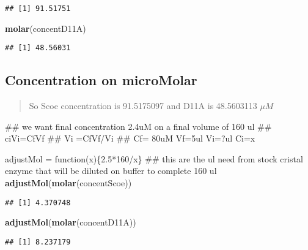 \documentclass[]{article}
\newenvironment{Shaded}{\begin{snugshade}}{\end{snugshade}}
\newcommand{\KeywordTok}[1]{\textcolor[rgb]{0.13,0.29,0.53}{\textbf{{#1}}}}
\newcommand{\DecValTok}[1]{\textcolor[rgb]{0.00,0.00,0.81}{{#1}}}
\newcommand{\FloatTok}[1]{\textcolor[rgb]{0.00,0.00,0.81}{{#1}}}
\newcommand{\StringTok}[1]{\textcolor[rgb]{0.31,0.60,0.02}{{#1}}}
\newcommand{\NormalTok}[1]{{#1}}
\begin{document}
\begin{verbatim}
## [1] 91.51751
\end{verbatim}

\begin{Shaded}
\begin{Highlighting}[]
\KeywordTok{molar}\NormalTok{(concentD11A)}
\end{Highlighting}
\end{Shaded}

\begin{verbatim}
## [1] 48.56031
\end{verbatim}

\subsection{Concentration on
microMolar}\label{concentration-on-micromolar}

\begin{quote}
So Scoe concentration is 91.5175097 and D11A is 48.5603113 \(\mu M\)
\end{quote}

\begin{Shaded}
\begin{Highlighting}[]
\NormalTok{## we want final concentration 2.4uM on a final volume of 160 ul}
\NormalTok{## ciVi=CfVf}
\NormalTok{## Vi =CfVf/Vi}
\NormalTok{## Cf= 80uM Vf=5ul Vi=?ul Ci=x}

\NormalTok{adjustMol =}\StringTok{ }\NormalTok{function(x)\{}\FloatTok{2.5}\NormalTok{*}\DecValTok{160}\NormalTok{/x\} }
\NormalTok{## this are the ul need from stock cristal enzyme that will be diluted on buffer to complete 160 ul }
\KeywordTok{adjustMol}\NormalTok{(}\KeywordTok{molar}\NormalTok{(concentScoe))}
\end{Highlighting}
\end{Shaded}

\begin{verbatim}
## [1] 4.370748
\end{verbatim}

\begin{Shaded}
\begin{Highlighting}[]
\KeywordTok{adjustMol}\NormalTok{(}\KeywordTok{molar}\NormalTok{(concentD11A))}
\end{Highlighting}
\end{Shaded}

\begin{verbatim}
## [1] 8.237179
\end{verbatim}
\end{document}
